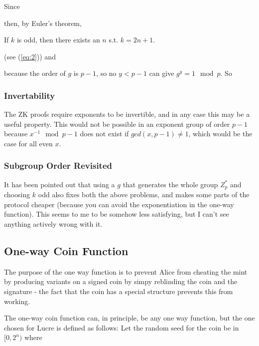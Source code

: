 \documentclass[a4paper,titlepage]{article}
\begin{document}
Since


then, by Euler's theorem, 


If $k$ is odd, then there exists an $n$ s.t. $k=2n+1$.



(see (\ref{eq:2})) and


because the order of $g$ is $p-1$, so no $y < p-1$ can give $g^y=1
 \mod p$. So


\subsubsection{Invertability}

The ZK proofs require exponents to be invertible, and in any case this
may be a useful property. This would not be possible in an exponent
group of order $p-1$ because $x^{-1}
\mod{p-1}$ does not exist if $gcd(x,p-1) \neq 1$, which would be the
case for all even $x$.

\subsubsection{Subgroup Order Revisited}

It has been pointed out that using a $g$ that generates the whole
group $Z_p^*$ and choosing $k$ odd also fixes both the above problems,
and makes some parts of the protocol cheaper (because you can avoid
the exponentiation in the one-way function). This seems to me to be
somehow less satisfying, but I can't see anything actively wrong with
it.

\subsection{One-way Coin Function}
\label{sec:oneway}

The purpose of the one way function is to prevent Alice from cheating
the mint by producing variants on a signed coin by simpy reblinding
the coin and the signature - the fact that the coin has a special
structure prevents this from working.

The one-way coin function can, in principle, be any one way function,
but the one chosen for Lucre is defined as follows: Let the random
seed for the coin be in $[0,2^n)$ where 
\end{document}
